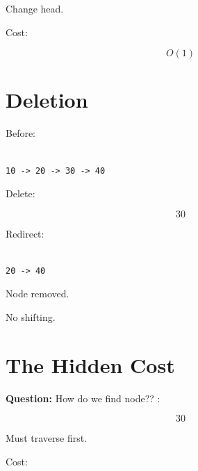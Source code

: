 \documentclass[11pt,a4paper]{book}
\newcommand{\question}[1]{
\vspace{0.5em}
\textbf{Question:} #1?
\vspace{0.2em}
}
\begin{document}

Change head.


Cost:

\[
O(1)
\]


\section{Deletion}

Before:

\begin{verbatim}

10 -> 20 -> 30 -> 40

\end{verbatim}


Delete:

\[
30
\]


Redirect:

\begin{verbatim}

20 -> 40

\end{verbatim}


Node removed.


No shifting.


\section{The Hidden Cost}

\question{How do we find node?}:

\[
30
\]


Must traverse first.


Cost:
\end{document}
